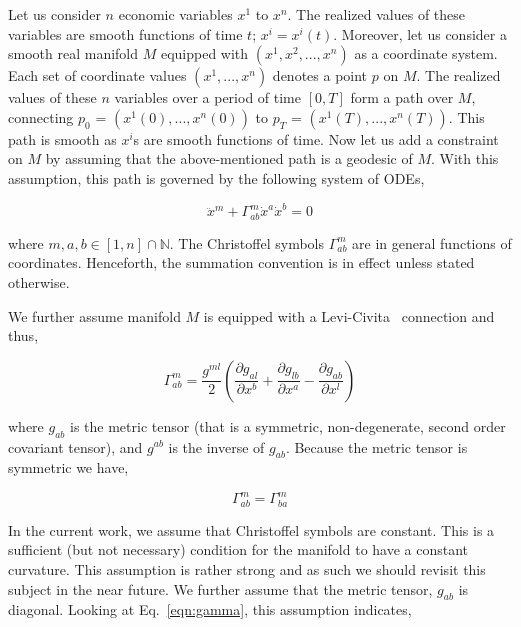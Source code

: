 \documentclass{article}
\begin{document}
Let us consider $n$ economic variables $x^{1}$ to $x^{n}$. The
realized values of these variables are smooth functions of time $t$;
$x^{i} = x^{i}(t)$. Moreover, let us consider a smooth real manifold
$M$ equipped with $(x^{1},x^{2},...,x^{n})$ as a coordinate
system. Each set of coordinate values $(x^{1},...,x^{n})$ denotes a
point $p$ on $M$. The realized values of these $n$ variables over a
period of time $[0,T]$ form a path over $M$, connecting $p_{0}$ =
$(x^{1}(0),...,x^{n}(0))$ to $p_{T}$ = $(x^{1}(T),...,x^{n}(T))$. This
path is smooth as $x^{i}$s are smooth functions of time. Now let us
add a constraint on $M$ by assuming that the above-mentioned path is a
geodesic of $M$. With this assumption, this path is governed by the
following system of ODEs,

\begin{equation}\label{eqn:geodesic}
\ddot{x}^{m} + \Gamma^{m}_{ab} \dot{x}^{a} \dot{x}^{b} = 0
\end{equation}

where $m,a,b \in [1,n] \cap \mathbb{N}$. The Christoffel symbols
$\Gamma^{m}_{ab}$ are in general functions of coordinates. Henceforth,
the summation convention is in effect unless stated otherwise.

We further assume manifold $M$ is equipped with a
Levi-Civita~\cite{deFelice:1990} connection and thus,

\begin{equation}\label{eqn:gamma}
\Gamma^{m}_{ab} = \frac{g^{ml}}{2} ( \frac{\partial g_{al}}{\partial
  x^{b}} + \frac{\partial g_{lb}}{\partial x^{a}} - \frac{\partial
  g_{ab}}{\partial x^{l}} )
\end{equation}

where $g_{ab}$ is the metric tensor (that is a symmetric,
non-degenerate, second order covariant tensor), and $g^{ab}$ is the
inverse of $g_{ab}$. Because the metric tensor is symmetric we have,

\begin{equation}\label{eqn:gamma-symmetry}
\Gamma^{m}_{ab} = \Gamma^{m}_{ba}
\end{equation}

In the current work, we assume that Christoffel symbols are
constant. This is a sufficient (but not necessary) condition for the
manifold to have a constant curvature. This assumption is rather
strong and as such we should revisit this subject in the near
future. We further assume that the metric tensor, $g_{ab}$ is
diagonal. Looking at Eq.~\ref{eqn:gamma}, this assumption indicates,
\end{document}
